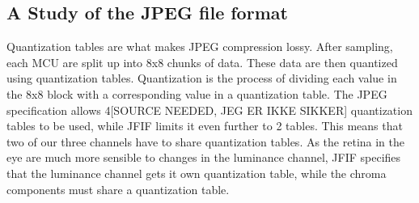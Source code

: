 \begin{infobox}{\section[A Study of the JPEG file format]{A Study of the JPEG file format}}
Quantization tables are what makes JPEG compression lossy. 
After sampling, each MCU are split up into 8x8 chunks of data. 
These data are then quantized using quantization tables. 
Quantization is the process of dividing each value in the 8x8 block with a corresponding value in a quantization table. 
The JPEG specification allows 4[SOURCE NEEDED, JEG ER IKKE SIKKER] quantization tables to be used, while JFIF limits it even further to 2 tables. 
This means that two of our three channels have to share quantization tables. 
As the retina in the eye are much more sensible to changes in the luminance channel, JFIF specifies that the luminance channel gets it own quantization table, while the chroma components must share a quantization table.

\end{infobox}